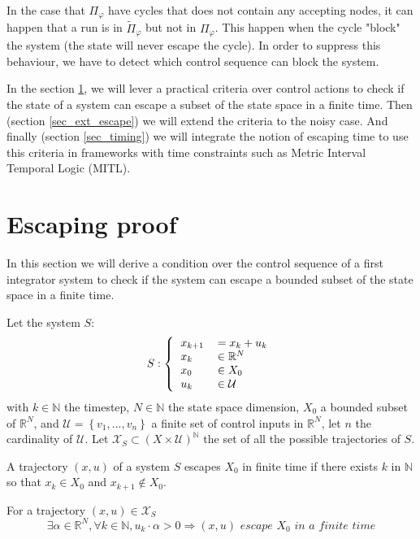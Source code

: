 In the case that $\Pi_\varphi$ have cycles that does not contain any accepting nodes, it can happen that a run is in $\widetilde{\Pi}_\varphi$ but not in $\Pi_\varphi$.
This happen when the cycle "block" the system (the state will never escape the cycle). In order to suppress this behaviour, we have to detect which control sequence can block the system.

In the section \ref{sec_escape}, we will lever a practical criteria over control actions to check if the state of a system can escape a subset of the state space in a finite time.
Then (section \ref{sec_ext_escape}) we will extend the criteria to the noisy case.
And finally (section \ref{sec_timing}) we will integrate the notion of escaping time to use this criteria in frameworks with time constraints such as Metric Interval Temporal Logic (MITL).

\section{Escaping proof}\label{sec_escape}
In this section we will derive a condition over the control sequence of a first integrator system to check if the system can escape a bounded subset of the state space in a finite time.

Let the system $S$:
\begin{equation}
S:\left \{
  \begin{tabular}{ll}
  $x_{k+1}$ &$= x_k + u_k$\\
  $x_k$ & $\in \mathbb{R}^N$\\
  $x_0$ & $\in X_0$\\
  $u_k$ & $\in \mathcal{U}$
  \end{tabular}
\right.
\end{equation}
with $k \in \mathbb{N}$ the timestep, $N \in \mathbb{N}$ the state space dimension, $X_0$ a bounded subset of $\mathbb{R}^N$, and $\mathcal{U} = \left \{v_1,...,v_n \right \}$ a finite set of control inputs in $\mathbb{R}^N$, let $n$ the cardinality of $\mathcal{U}$.
Let $\mathcal{X}_S \subset (X \times \mathcal{U})^{\mathbb{N}}$ the set of all the possible trajectories of $S$.

\begin{definition}
A trajectory $(x,u)$ of a system $S$ escapes $X_0$ in finite time if there exists $k$ in $\mathbb{N}$ so that $x_k \in X_0$ and $x_{k+1} \notin X_0$.
\end{definition}

\begin{property} \label{prop_escape}
For a trajectory $(x,u) \in \mathcal{X}_S$ 
$$
\exists \alpha \in \mathbb{R}^N, \forall k \in \mathbb{N}, u_k \cdot \alpha > 0
\Rightarrow
(x,u) \textit{ escape } X_0 \textit{ in a finite time} 
$$
\end{property}

